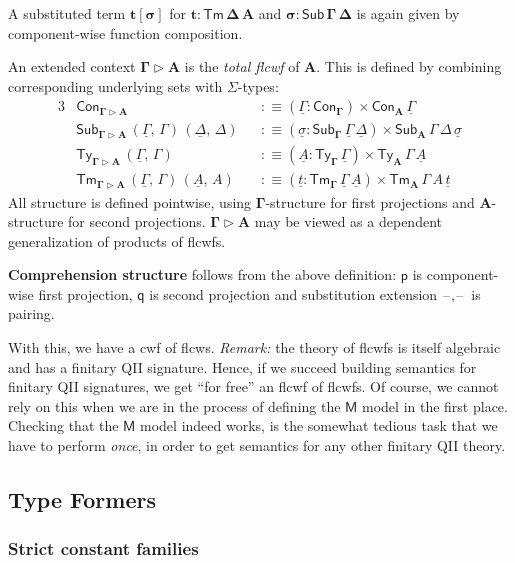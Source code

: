 \documentclass[12pt,a4paper,twoside,openany]{book}
\theoremstyle{remark}
\theoremstyle{definition}
\theoremstyle{theorem}
\newcommand{\bs}[1]{\boldsymbol{#1}}
\newcommand{\Con}{\mathsf{Con}}
\newcommand{\Sub}{\mathsf{Sub}}
\newcommand{\Tm}{\mathsf{Tm}}
\newcommand{\Ty}{\mathsf{Ty}}
\newcommand{\blank}{\mathord{\hspace{1pt}\text{--}\hspace{1pt}}}
\newcommand{\ext}{\triangleright}
\newcommand{\p}{\mathsf{p}}
\newcommand{\q}{\mathsf{q}}
\newcommand{\bGamma}{\bs{\Gamma}}
\newcommand{\bA}{\bs{A}}
\newcommand{\bM}{\bs{\mathsf{M}}}
\newcommand{\ul}[1]{\underline{#1}}
\newcommand{\ulGamma}{\ul{\Gamma}}
\newcommand{\ulDelta}{\ul{\Delta}}
\newcommand{\ulsigma}{\ul{\sigma}}
\newcommand{\ult}{\ul{t}}
\newcommand{\ulA}{\ul{A}}
\newcommand{\defn}{:\equiv}
\begin{document}
A substituted term $\bs{t[\sigma]}$ for $\bs{t : \Tm\,\Delta\,A}$ and
$\bs{\sigma : \Sub\,\Gamma\,\Delta}$ is again given by component-wise function
composition.

An extended context $\bs{\Gamma \ext A}$ is the \emph{total flcwf} of
$\bA$. This is defined by combining corresponding underlying sets with
$\Sigma$-types:
\begin{alignat*}{3}
  & \Con_{\bs{\Gamma \ext A}} &&\defn (\ulGamma : \Con_{\bGamma}) \times \Con_{\bA}\,\ulGamma\\
  & \Sub_{\bs{\Gamma \ext A}}\,(\ulGamma,\,\Gamma)\,(\ulDelta,\,\Delta) &&\defn (\ulsigma : \Sub_{\bGamma}\,\ulGamma\,\ulDelta) \times \Sub_{\bA}\,\Gamma\,\Delta\,\ulsigma\\
  & \Ty_{\bs{\Gamma \ext A}}\,(\ulGamma,\,\Gamma) &&\defn (\ulA : \Ty_{\bGamma}\,\ulGamma) \times \Ty_{\bA}\,\Gamma\,\ulA\\
  & \Tm_{\bs{\Gamma \ext A}}\,(\ulGamma,\,\Gamma)\,(\ulA,\,A) &&\defn (\ult : \Tm_{\bGamma}\,\ulGamma\,\ulA) \times \Tm_{\bA}\,\Gamma\,A\,\ult
\end{alignat*}
All structure is defined pointwise, using $\bGamma$-structure for first
projections and $\bA$-structure for second projections. $\bs{\Gamma \ext A}$ may
be viewed as a dependent generalization of products of flcwfs.

\textbf{Comprehension structure} follows from the above definition: $\bs{\p}$ is
component-wise first projection, $\bs{\q}$ is second projection and substitution
extension $\bs{\blank,\blank}$ is pairing.

With this, we have a cwf of flcws. \emph{Remark:} the theory of flcwfs is itself
algebraic and has a finitary QII signature. Hence, if we succeed building
semantics for finitary QII signatures, we get ``for free'' an flcwf of
flcwfs. Of course, we cannot rely on this when we are in the process of defining
the $\bM$ model in the first place. Checking that the $\bM$ model indeed works,
is the somewhat tedious task that we have to perform \emph{once}, in order to
get semantics for any other finitary QII theory.

\subsection{Type Formers}

\subsubsection{Strict constant families}
\end{document}
